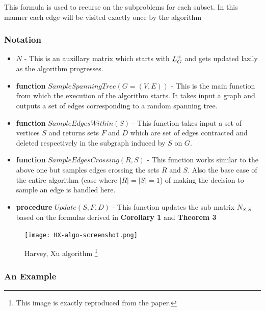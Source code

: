 This formula is used to recurse on the subproblems for each subset. In this manner each edge will be visited exactly once by the algorithm

\subsubsection{Notation}
\begin{itemize}
 \item $N$ - This is an auxillary matrix which starts with $L_{G}^{+}$ and gets updated lazily as the algorithm progresses.
 \item \textbf{function} $SampleSpanningTree(G = (V, E))$ - This is the main function from which the execution of the algorithm starts. It takes input a graph and outputs a set of edges corresponding to a random spanning tree.
 \item \textbf{function} $SampleEdgesWithin(S)$ - This function takes input a set of vertices $S$ and returns sets $F$ and $D$ which are set of edges contracted and deleted respectively in the subgraph induced by $S$ on $G$. 
 \item \textbf{function} $SampleEdgesCrossing(R,S)$ - This function works similar to the above one but samples edges crossing the sets $R$ and $S$. Also the base case of the entire algorithm (case where $|R| = |S| = 1$) of making the decision to sample an edge is handled here.
 \item \textbf{procedure} $Update(S,F,D)$ - This function updates the sub matrix $N_{S,S}$ based on the formulas derived in \textbf{Corollary 1} and \textbf{Theorem 3}
\end{itemize}

\pagebreak


\begin{figure}[h!]
\begin{minipage}{\textwidth}
      \texttt{[image: HX-algo-screenshot.png]}
    \caption[Harvey, Xu algorithm]%
    {Harvey, Xu algorithm \footnote{This image is exactly reproduced from the paper.} }
  \end{minipage}

  \label{fig:alg}
\end{figure}
\pagebreak


\subsubsection{An Example}

